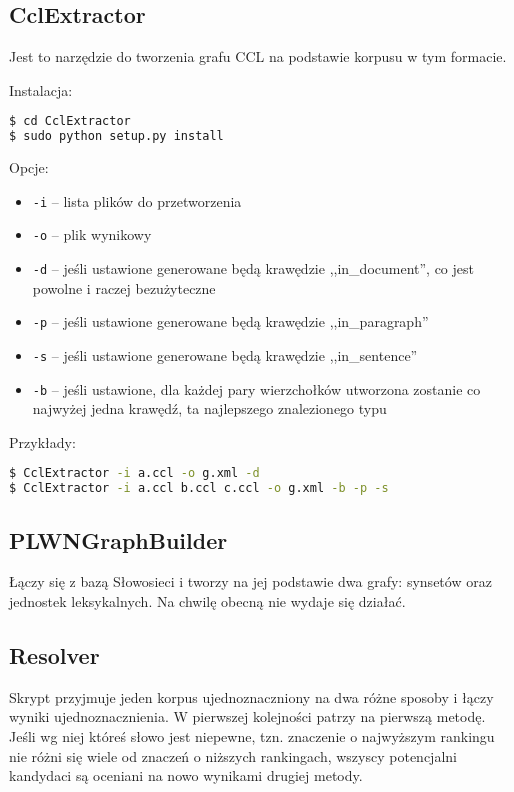 \documentclass[10pt,a4paper]{article}
\begin{document}
\subsection{CclExtractor}
Jest to narzędzie do tworzenia grafu CCL na podstawie korpusu w tym formacie.

Instalacja:
\begin{lstlisting}[language=bash]
$ cd CclExtractor
$ sudo python setup.py install
\end{lstlisting}

Opcje:
\begin{itemize}
	\item \texttt{-i} -- lista plików do przetworzenia
	\item \texttt{-o} -- plik wynikowy
	\item \texttt{-d} -- jeśli ustawione generowane będą krawędzie ,,in\_document'', co jest powolne i raczej bezużyteczne
	\item \texttt{-p} -- jeśli ustawione generowane będą krawędzie ,,in\_paragraph''
	\item \texttt{-s} -- jeśli ustawione generowane będą krawędzie ,,in\_sentence''
	\item \texttt{-b} -- jeśli ustawione, dla każdej pary wierzchołków utworzona zostanie co najwyżej jedna krawędź, ta najlepszego znalezionego typu
\end{itemize}

Przykłady:
\begin{lstlisting}[language=bash]
$ CclExtractor -i a.ccl -o g.xml -d
$ CclExtractor -i a.ccl b.ccl c.ccl -o g.xml -b -p -s
\end{lstlisting}


\subsection{PLWNGraphBuilder}  %
Łączy się z bazą Słowosieci i tworzy na jej podstawie dwa grafy: synsetów oraz jednostek leksykalnych. Na chwilę obecną nie wydaje się działać.


\subsection{Resolver}
Skrypt przyjmuje jeden korpus ujednoznaczniony na dwa różne sposoby i łączy wyniki ujednoznacznienia. W pierwszej kolejności patrzy na pierwszą metodę. Jeśli wg niej któreś słowo jest niepewne, tzn. znaczenie o najwyższym rankingu nie różni się wiele od znaczeń o niższych rankingach, wszyscy potencjalni kandydaci są oceniani na nowo wynikami drugiej metody.
\end{document}
